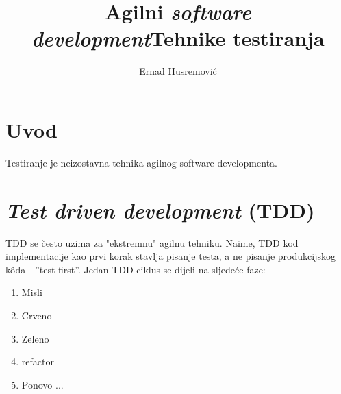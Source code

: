 \documentclass[times, utf8, seminar]{fit}
\begin{document}
\setlength{\parindent}{0pt}


\title{Agilni \emph{software development}\newline Tehnike testiranja}

\author{Ernad Husremović}

\maketitle

\tableofcontents

\newpage

%
%


\chapter{Uvod}
\vspace*{-0.7cm}

Testiranje je neizostavna tehnika agilnog software developmenta.

\chapter{\emph{Test driven development} (TDD)}

TDD se često uzima za "ekstremnu" agilnu tehniku. Naime, TDD kod implementacije kao prvi korak stavlja pisanje testa, a ne pisanje produkcijskog k\^oda - ''test first''. Jedan TDD ciklus se dijeli na sljedeće faze:

\begin{enumerate}
  \item Misli
  \item Crveno
  \item Zeleno
  \item refactor
  \item Ponovo ...
\end{enumerate}
\end{document}
